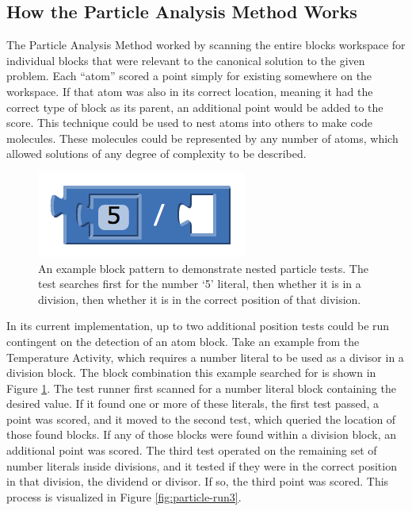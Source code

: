 \subsection{How the Particle Analysis Method Works}
The Particle Analysis Method worked by scanning the entire blocks workspace for individual blocks that were relevant to the canonical solution to the given problem. Each ``atom'' scored a point simply for existing somewhere on the workspace. If that atom was also in its correct location, meaning it had the correct type of block as its parent, an additional point would be added to the score. This technique could be used to nest atoms into others to make code molecules. These molecules could be represented by any number of atoms, which allowed solutions of any degree of complexity to be described.

\begin{figure}
  \centering
      \includegraphics{images/ch4-particle-example-5div}
  \caption[Blocks Demonstrating Nested Particle Tests]{An example block pattern to demonstrate nested particle tests. The test searches first for the number `5' literal, then whether it is in a division, then whether it is in the correct position of that division.}
  \label{fig:particle-example-5div}
\end{figure}
In its current implementation, up to two additional position tests could be run contingent on the detection of an atom block. Take an example from the Temperature Activity, which requires a number literal to be used as a divisor in a division block. The block combination this example searched for is shown in Figure \ref{fig:particle-example-5div}. The test runner first scanned for a number literal block containing the desired value. If it found one or more of these literals, the first test passed, a point was scored, and it moved to the second test, which queried the location of those found blocks. If any of those blocks were found within a division block, an additional point was scored. The third test operated on the remaining set of number literals inside divisions, and it tested if they were in the correct position in that division, the dividend or divisor. If so, the third point was scored. This process is visualized in Figure \ref{fig:particle-run3}.

